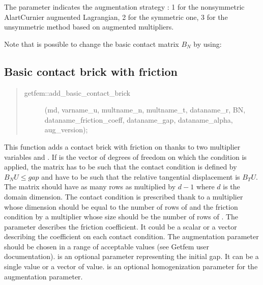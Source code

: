 \documentclass[a4paper,11pt,english]{sphinxmanual}
\begin{document}
The parameter  indicates the augmentation strategy : 1 for the non\sphinxhyphen{}symmetric Alart\sphinxhyphen{}Curnier augmented Lagrangian, 2 for the symmetric one, 3 for the unsymmetric method based on augmented multipliers.

Note that is possible to change the basic contact matrix \(B_N\) by using:

\begin{sphinxVerbatim}[commandchars=\\\{\}]
 
\end{sphinxVerbatim}


\subsection{Basic contact brick with friction}
\label{\detokenize{userdoc/model_contact_friction:basic-contact-brick-with-friction}}\begin{quote}
\begin{description}
\item[{getfem::add\_basic\_contact\_brick}] \leavevmode
(md, varname\_u, multname\_n, multname\_t, dataname\_r, BN, dataname\_friction\_coeff, dataname\_gap, dataname\_alpha, aug\_version);

\end{description}
\end{quote}

This function adds a contact brick with friction on  thanks to two
multiplier variables  and . If  is the vector
of degrees of freedom on which the condition is applied,
the matrix  has to be such that the contact condition is defined
by \(B_N U \le gap\) and  have to be such that the relative
tangential
displacement is \(B_T U\). The matrix  should have as many rows as
 multiplied by \(d-1\) where \(d\) is the domain dimension.
The contact condition is prescribed thank to a multiplier
 whose dimension should be equal to the number of rows of
 and the friction condition by a multiplier  whose
size should be the number of rows of .
The parameter  describes the friction
coefficient. It could be a scalar or a vector describing the
coefficient on each contact condition.
The augmentation parameter  should be chosen in a range of acceptable values
(see Getfem user documentation).  is an
optional parameter representing the initial gap. It can be a single value
or a vector of value.  is an optional homogenization
parameter for the augmentation parameter.
\end{document}
